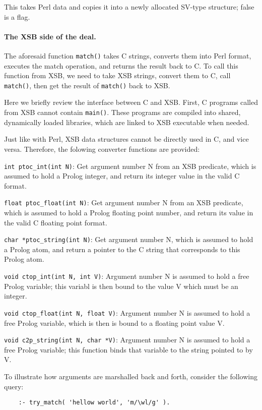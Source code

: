 \documentclass{article}
\begin{document}
{This takes Perl data and copies it into a newly allocated SV-type
structure; false is a flag.

\paragraph{The XSB side of the deal.}
The aforesaid function {\tt match()}  takes C strings, converts them into
Perl format, executes the match operation, and returns the result back to C.
To call this function from XSB, we need to take XSB strings, convert them
to C, call {\tt match()}, then get the result of {\tt match()} back to XSB.  

Here we briefly review the interface between C and XSB. First, C programs
called from XSB cannot contain {\tt main()}. These programs are compiled
into shared, dynamically loaded libraries, which are linked to XSB
executable when needed.

Just like with Perl, XSB data structures cannot be directly used in C, and
vice versa. Therefore, the folowing converter functions are provided:

\noindent
{\tt int ptoc\_int(int N)}: Get argument number N from an XSB predicate,
which is assumed to hold a Prolog integer, and return its integer value in
the valid C format.

\noindent
{\tt float ptoc\_float(int N)}: Get argument number N from an XSB predicate,
which is assumed to hold a Prolog floating point number, and return its
value in the valid C floating point format.

\noindent
{\tt char *ptoc\_string(int N)}: Get argument number N, which is assumed to
hold a Prolog atom, and return a pointer to the C string that corresponds
to this Prolog atom.

\noindent
{\tt void ctop\_int(int N, int V)}: Argument number N is assumed to hold a
free Prolog variable; this variabl is then bound to the value V which must
be an integer.

\noindent
{\tt void ctop\_float(int N, float V)}: Argument number N is assumed to hold a
free Prolog variable, which is then is bound to a floating point value V.

\noindent
{\tt void c2p\_string(int N, char *V)}: Argument number N is assumed to hold a
free Prolog variable; this function binds that variable to the string
pointed to by V.


To illustrate how arguments are marshalled back and forth, consider
the following query:

\begin{verbatim}
    :- try_match( 'hellow world', 'm/\wl/g' ).
\end{verbatim}


}
\end{document}
